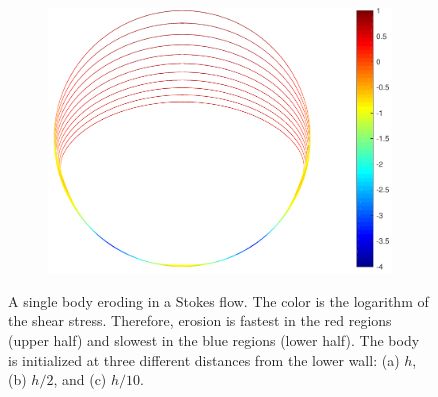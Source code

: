 \documentclass[preprint,10pt]{elsarticle}
\begin{document}
\begin{figure}[htbp]
\begin{center}
\begin{subfigure}[b]{0.3\textwidth}
\caption{}
\end{subfigure}
\begin{subfigure}[b]{0.38\textwidth}
\includegraphics[width =\textwidth]{./figs/1b_0d4r0d1h_shear}
\caption{}
\end{subfigure}
\caption{\label{fig:NearWall} A single body eroding in a Stokes flow.
The color is the logarithm of the shear stress. Therefore, erosion is
fastest in the red regions (upper half) and slowest in the blue regions
(lower half).  The body is initialized at three different distances from
the lower wall: (a) $h$, (b) $h/2$, and (c) $h/10$.}
\end{center}
\end{figure}
\end{document}
